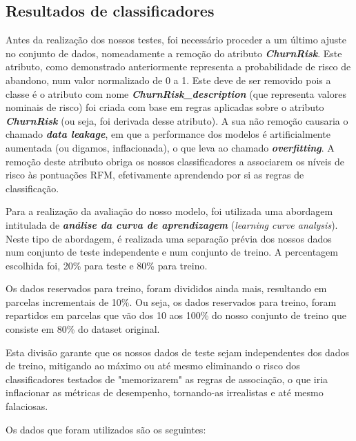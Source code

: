 \documentclass{easychair}
\begin{document}
\newpage
\subsection{Resultados de classificadores}

Antes da realização dos nossos testes, foi necessário proceder a um último ajuste no conjunto de dados, nomeadamente a remoção do atributo \textit{\textbf{ChurnRisk}}. Este atributo, como demonstrado anteriormente representa a probabilidade de risco de abandono, num valor normalizado de 0 a 1. Este deve de ser removido pois a classe é o atributo com nome \textit{\textbf{ChurnRisk_description}} (que representa valores nominais de risco) foi criada com base em regras aplicadas sobre o atributo \textit{\textbf{ChurnRisk}} (ou seja, foi derivada desse atributo). A sua não remoção causaria o chamado \textit{\textbf{data leakage}}, em que a performance dos modelos é artificialmente aumentada (ou digamos, inflacionada), o que leva ao chamado \textit{\textbf{overfitting}}. A remoção deste atributo obriga os nossos classificadores a associarem os níveis de risco às pontuações RFM, efetivamente aprendendo por si as regras de classificação.

Para a realização da avaliação do nosso modelo, foi utilizada uma abordagem intitulada de \textbf{\textit{análise da curva de aprendizagem}} (\textit{learning curve analysis}). Neste tipo de abordagem, é realizada uma separação prévia dos nossos dados num conjunto de teste independente e num conjunto de treino. A percentagem escolhida foi, 20\% para teste e 80\% para treino.

Os dados reservados para treino, foram divididos ainda mais, resultando em parcelas incrementais de 10\%. Ou seja, os dados reservados para treino, foram repartidos em parcelas que vão dos 10 aos 100\% do nosso conjunto de treino que consiste em 80\% do dataset original.

Esta divisão garante que os nossos dados de teste sejam independentes dos dados de treino, mitigando ao máximo ou até mesmo eliminando o risco dos classificadores testados de "memorizarem" as regras de associação, o que iria inflacionar as métricas de desempenho, tornando-as irrealistas e até mesmo falaciosas.


Os dados que foram utilizados são os seguintes:
\end{document}
